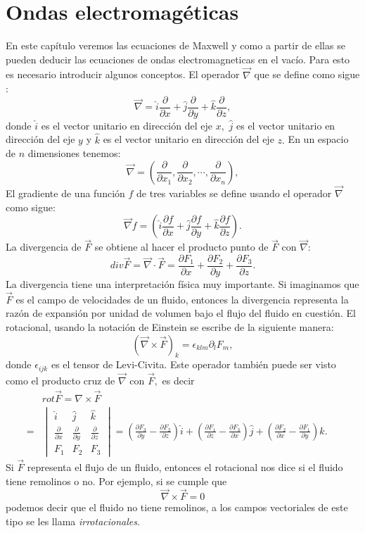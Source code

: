 \documentclass[letterpaper,12pt,oneside]{book}
\begin{document}
\chapter{Ondas electromag\'eticas}
En este cap\'itulo veremos las ecuaciones de Maxwell y como a partir de ellas se pueden deducir las ecuaciones  de ondas electromagneticas en el vac\'io.
Para esto es necesario introducir algunos conceptos. 
El operador $\vec \nabla$ que se define como sigue \cite{marsden}: 
%
$$\vec \nabla =\hat i \frac{\partial}{\partial x} + \hat j \frac{\partial}{\partial y} + \hat k \frac{\partial}{\partial z},$$
%
donde $\hat i$ es el vector unitario en direcci\'on del eje $x,$ $\hat j$ es el vector unitario en direcci\'on del eje $y$
y $\hat k$ es el vector unitario en direcci\'on del eje $z.$ En un espacio de $n$ dimensiones tenemos:
%
$$\vec \nabla = \left(\frac{\partial}{\partial x_1} ,\frac{\partial}{\partial x_2} , \cdots ,\frac{\partial}{\partial x_n}\right),$$
%
El gradiente de una funci\'on $f$ de tres variables se define usando el operador $\vec \nabla$ como sigue: 
$$\vec  \nabla f = \left( \hat i\frac{\partial f}{\partial x} + \hat j\frac{\partial f}{\partial y} + \hat k\frac{\partial f}{\partial z} \right).$$
%
La divergencia de $\vec F$ se obtiene al hacer el producto punto de $\vec F$ con $\vec \nabla$:
%
$$ div \vec F =\vec  \nabla \cdot \vec F = \frac{\partial F_1}{\partial x} + \frac{\partial F_2}{\partial y} + \frac{\partial F_3}{\partial z}. $$
%
La divergencia tiene una interpretaci\'on f\'isica muy importante. Si imaginamos que $\vec  F$ es el campo de velocidades de un fluido, entonces la divergencia representa la raz\'on de expansi\'on por unidad de volumen bajo el flujo del fluido en cuesti\'on.
El rotacional, usando la notaci\'on de Einstein se escribe de la siguiente manera: 
%
$$(\vec \nabla \times \vec F)_k = \epsilon_{klm} \partial_l F_m,$$
%
donde $\epsilon_{ijk}$ es el tensor de Levi-Civita. Este operador tambi\'en puede ser visto como el producto cruz de $\vec \nabla$ con $\vec F,$ es decir 
%
\begin{eqnarray}
& & rot \vec F= \nabla \times \vec F\nonumber\\
& =& \begin{vmatrix} \hat i & \hat j & \hat k\\
\frac{\partial}{\partial x} & \frac{\partial }{\partial y} & \frac{\partial }{\partial z} \\
F_1 & F_2 & F_3
 \end{vmatrix} = \left(\frac{\partial F_3}{\partial y} - \frac{\partial F_2}{\partial z}\right )\hat i + \left(\frac{\partial F_1}{\partial z} - \frac{\partial F_3}{\partial x}\right)\hat j + \left (\frac{\partial F_2}{\partial x} - \frac{\partial F_1}{\partial y}\right)\hat k.\qquad \nonumber
 \end{eqnarray}
%
Si $\vec F$ representa el flujo de un fluido, entonces el rotacional nos dice si el fluido tiene remolinos o no. Por ejemplo, si  se cumple que 
%
$$\vec \nabla \times \vec F = 0$$
%
podemos decir que el fluido no tiene remolinos, a  los campos vectoriales de este tipo se les llama \textit{irrotacionales}.\\
\end{document}
